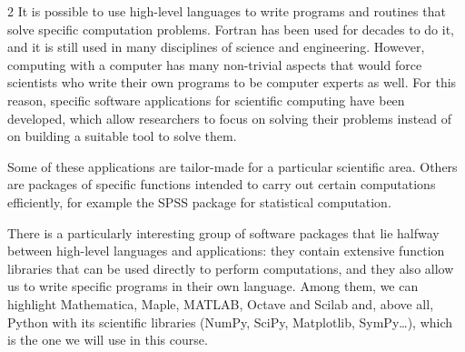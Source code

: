 \begin{paracol}{2}
It is possible to use high-level languages to write programs and routines that solve specific computation problems. Fortran has been used for decades to do it, and it is still used in many disciplines of science and engineering. However, computing with a computer has many non-trivial aspects that would force scientists who write their own programs to be computer experts as well. For this reason, specific software applications for scientific computing have been developed, which allow researchers to focus on solving their problems instead of on building a suitable tool to solve them.

Some of these applications are tailor-made for a particular scientific area. Others are packages of specific functions intended to carry out certain computations efficiently, for example the SPSS package for statistical computation.

There is a particularly interesting group of software packages that lie halfway between high-level languages and applications: they contain extensive function libraries that can be used directly to perform computations, and they also allow us to write specific programs in their own language. Among them, we can highlight Mathematica, Maple, MATLAB, Octave and Scilab and, above all, Python with its scientific libraries (NumPy, SciPy, Matplotlib, SymPy\ldots), which is the one we will use in this course.

\end{paracol}

